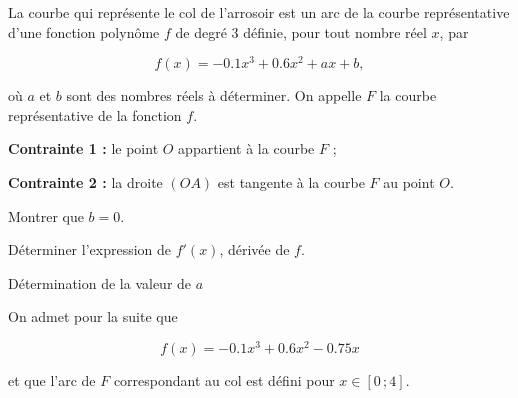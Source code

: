 \documentclass[answers]{exam}
\begin{document}
La courbe qui représente le col de l'arrosoir est un arc de la courbe
représentative d'une fonction polynôme $f$ de degré 3 définie, pour tout
nombre réel $x$, par

\[
  f(x)=-0.1x^{3}+0.6x^{2}+ax+b ,
\]

où $a$ et $b$ sont des nombres réels à déterminer.
On appelle $F$ la courbe représentative de la fonction $f$.

\begin{compactenum}
  \item \textbf{Contrainte 1 :} le point $O$ appartient à la courbe $F$ ;
  \item \textbf{Contrainte 2 :} la droite $(OA)$ est tangente à la courbe $F$ au point $O$.
\end{compactenum}


\begin{questions}

  \question[0.5] Montrer que $b = 0$.
  
  
\question[1] Déterminer l’expression de $f'(x)$, dérivée de $f$.
  
  
\question[2.5] Détermination de la valeur de $a$
  
\question[5.5] On admet pour la suite que
  
  \[
  f(x) = -0.1x^{3} + 0.6x^{2} - 0.75x
  \]
  
  et que l’arc de $F$ correspondant au col est défini pour $x \in [0\,;4]$.
  
\end{questions}
\end{document}
